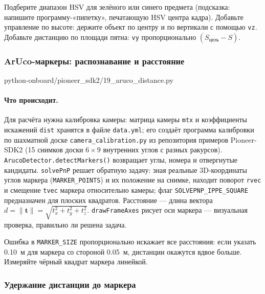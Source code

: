 \begin{taskbox}
Подберите диапазон HSV для зелёного или синего предмета (подсказка: напишите программу-«пипетку», печатающую HSV центра кадра). Добавьте управление по высоте: держите объект по центру и по вертикали с помощью \verb|vz|. Добавьте дистанцию по площади пятна: \verb|vy| пропорционально $(S_\text{цель} - S)$.
\end{taskbox}

\subsubsection*{ArUco-маркеры: распознавание и расстояние}

\begin{codefile}[python]{python-onboard/pioneer_sdk2/19_aruco_distance.py}
\end{codefile}

\paragraph{Что происходит.} Для расчёта нужна калибровка камеры: матрица камеры \verb|mtx| и коэффициенты искажений \verb|dist| хранятся в файле \texttt{data.yml}; его создаёт программа калибровки по шахматной доске \texttt{camera\_calibration.py} из репозитория примеров Pioneer-SDK2 (15 снимков доски $6\times9$ внутренних углов с разных ракурсов). \verb|ArucoDetector.detectMarkers()| возвращает углы, номера и отвергнутые кандидаты. \verb|solvePnP| решает обратную задачу: зная реальные 3D-координаты углов маркера (\verb|MARKER_POINTS|) и их положение на снимке, находит поворот \verb|rvec| и смещение \verb|tvec| маркера относительно камеры; флаг \verb|SOLVEPNP_IPPE_SQUARE| предназначен для плоских квадратов. Расстояние --- длина вектора $d = \lVert\mathbf t\rVert = \sqrt{t_x^2+t_y^2+t_z^2}$. \verb|drawFrameAxes| рисует оси маркера --- визуальная проверка, правильно ли решена задача.

\begin{warnbox}
Ошибка в \verb|MARKER_SIZE| пропорционально искажает все расстояния: если указать 0.10~м для маркера со стороной 0.05~м, дистанции окажутся вдвое больше. Измеряйте чёрный квадрат маркера линейкой.
\end{warnbox}

\subsubsection*{Удержание дистанции до маркера}


